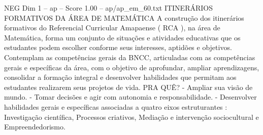\begin{textsample}{NEG Dim 1 – ap – Score 1.00 – ap/ap\_em\_60.txt}  \label{ex:f1_neg_121}
ITINERÁRIOS FORMATIVOS DA ÁREA DE MATEMÁTICA A construção dos itinerários formativos do Referencial Curricular Amapaense ( RCA ), na área de Matemática, forma um conjunto de situações e atividades educativas que os estudantes podem escolher conforme seus interesses, aptidões e objetivos.
Contemplam as competências gerais da BNCC, articuladas com as competências gerais e específicas da área, com o objetivo de aprofundar, ampliar aprendizagens, consolidar a formação integral e desenvolver habilidades que permitam aos estudantes realizarem seus projetos de vida.
PRA QUÊ? - Ampliar sua visão de mundo. - Tomar decisões e agir com autonomia e responsabilidade. - Desenvolver habilidades gerais e específicas associadas a quatro eixos estruturantes : Investigação científica, Processos criativos, Mediação e intervenção sociocultural e Empreendedorismo.

\end{textsample}
